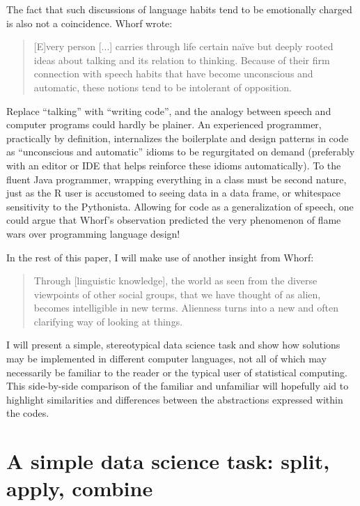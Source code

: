 \documentclass[11pt]{asaproc}
\begin{document}
The fact that such discussions of language habits tend to be emotionally
charged is also not a coincidence. Whorf wrote:

\begin{quotation}
[E]very person [...] carries through life certain na\"ive but deeply rooted
ideas about talking and its relation to thinking. Because of their firm
connection with speech habits that have become unconscious and automatic, these
notions tend to be intolerant of opposition.~\citep{Whorf1956sl}
\end{quotation}

Replace ``talking'' with ``writing code'', and the analogy between speech and
computer programs could hardly be plainer. An experienced programmer,
practically by definition, internalizes the boilerplate and design patterns in
code as ``unconscious and automatic'' idioms to be regurgitated on demand
(preferably with an editor or IDE that helps reinforce these idioms
automatically). To the fluent Java programmer, wrapping everything in a class
must be second nature, just as the R user is accustomed to seeing data in a
data frame, or whitespace sensitivity to the Pythonista.  Allowing for code as
a generalization of speech, one could argue that Whorf's observation predicted
the very phenomenon of flame wars over programming language design!

In the rest of this paper, I will make use of another insight from Whorf:

\begin{quotation}
Through [linguistic knowledge], the world as seen from the diverse viewpoints of
other social groups, that we have thought of as alien, becomes intelligible in
new terms. Alienness turns into a new and often clarifying way of looking at
things.~\citep{Whorf1956lmr}
\end{quotation}

I will present a simple, stereotypical data science task and show how solutions
may be implemented in different computer languages, not all of which may
necessarily be familiar to the reader or the typical user of statistical
computing. This side-by-side comparison of the familiar and unfamiliar will
hopefully aid to highlight similarities and differences between the
abstractions expressed within the codes.



\section{A simple data science task: split, apply, combine}
\end{document}
